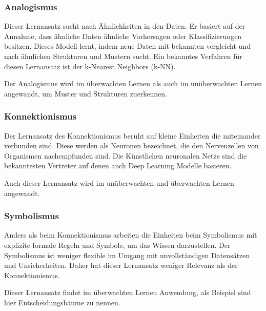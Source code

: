 

\subsubsection{Analogismus}
Dieser Lernansatz sucht nach Ähnlichkeiten in den Daten. Er basiert auf der Annahme, dass ähnliche Daten ähnliche Vorhersagen oder Klassifizierungen besitzen. Dieses Modell lernt, indem neue Daten mit bekannten vergleicht und nach ähnlichen Strukturen und Mustern sucht. Ein bekanntes Verfahren für diesen Lernansatz ist der k-Nearest Neighbors (\acrshort{k-NN}).\vspace{0.2cm}

Der Analogismus wird im überwachten Lernen als auch im unüberwachten Lernen angewandt, um Muster und Strukturen zuerkennen.

\subsubsection{Konnektionismus}
Der Lernansatz des Konnektionismus beruht auf kleine Einheiten die miteinander verbunden sind. Diese werden als Neuronen bezeichnet, die den Nervenzellen von Organismen nachempfunden sind. Die Künstlichen neuronalen Netze sind die bekanntesten Vertreter auf denen auch Deep Learning Modelle basieren.\vspace{0.2cm}

Auch dieser Lernansatz wird im unüberwachten und überwachten Lernen angewandt.

\subsubsection{Symbolismus}
Anders als beim Konnektionismus arbeiten die Einheiten beim Symbolismus mit explizite formale Regeln und Symbole, um das Wissen darzustellen. Der Symbolismus ist weniger flexible im Umgang mit unvollständigen Datensätzen und Unsicherheiten. Daher hat dieser Lernansatz weniger Relevanz als der Konnektionismus.\vspace{0.2cm}

Dieser Lernansatz findet im überwachten Lernen Anwendung, als Beispiel sind hier Entscheidungsbäume zu nennen.



